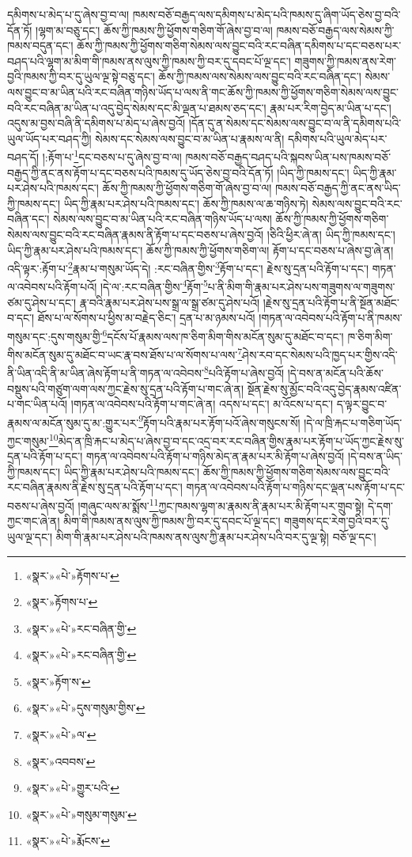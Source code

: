 དམིགས་པ་མེད་པ་དུ་ཞེས་བྱ་བ་ལ། ཁམས་བཅོ་བརྒྱད་ལས་དམིགས་པ་མེད་པའི་ཁམས་དུ་ཞིག་ཡོད་ཅེས་བྱ་བའི་དོན་ཏོ། །ལྷག་མ་བཅུ་དང་། ཆོས་ཀྱི་ཁམས་ཀྱི་ཕྱོགས་གཅིག་གོ་ཞེས་བྱ་བ་ལ། ཁམས་བཅོ་བརྒྱད་ལས་སེམས་ཀྱི་ཁམས་བདུན་དང་། ཆོས་ཀྱི་ཁམས་ཀྱི་ཕྱོགས་གཅིག་སེམས་ལས་བྱུང་བའི་རང་བཞིན་དམིགས་པ་དང་བཅས་པར་བཤད་པའི་ལྷག་མ་མིག་གི་ཁམས་ནས་ལུས་ཀྱི་ཁམས་ཀྱི་བར་དུ་དབང་པོ་ལྔ་དང་། གཟུགས་ཀྱི་ཁམས་ནས་རེག་བྱའི་ཁམས་ཀྱི་བར་དུ་ཡུལ་ལྔ་སྟེ་བཅུ་དང་། ཆོས་ཀྱི་ཁམས་ལས་སེམས་ལས་བྱུང་བའི་རང་བཞིན་དང་། སེམས་ལས་བྱུང་བ་མ་ཡིན་པའི་རང་བཞིན་གཉིས་ཡོད་པ་ལས་ནི་གང་ཆོས་ཀྱི་ཁམས་ཀྱི་ཕྱོགས་གཅིག་སེམས་ལས་བྱུང་བའི་རང་བཞིན་མ་ཡིན་པ་འདུ་བྱེད་སེམས་དང་མི་ལྡན་པ་ཐམས་ཅད་དང་། རྣམ་པར་རིག་བྱེད་མ་ཡིན་པ་དང་། འདུས་མ་བྱས་བཞི་ནི་དམིགས་པ་མེད་པ་ཞེས་བྱའོ། །དོན་དུ་ན་སེམས་དང་སེམས་ལས་བྱུང་བ་ལ་ནི་དམིགས་པའི་ཡུལ་ཡོད་པར་བཤད་ཀྱི། སེམས་དང་སེམས་ལས་བྱུང་བ་མ་ཡིན་པ་རྣམས་ལ་ནི། དམིགས་པའི་ཡུལ་མེད་པར་བཤད་དོ། །:རྟོག་པ་\footnote{«སྣར་»«པེ་»རྟོགས་པ་}དང་བཅས་པ་དུ་ཞེས་བྱ་བ་ལ། ཁམས་བཅོ་བརྒྱད་བཤད་པའི་སྐབས་ཡིན་པས་ཁམས་བཅོ་བརྒྱད་ཀྱི་ནང་ནས་རྟོག་པ་དང་བཅས་པའི་ཁམས་དུ་ཡོད་ཅེས་བྱ་བའི་དོན་ཏོ། །ཡིད་ཀྱི་ཁམས་དང་། ཡིད་ཀྱི་རྣམ་པར་ཤེས་པའི་ཁམས་དང་། ཆོས་ཀྱི་ཁམས་ཀྱི་ཕྱོགས་གཅིག་གོ་ཞེས་བྱ་བ་ལ། ཁམས་བཅོ་བརྒྱད་ཀྱི་ནང་ནས་ཡིད་ཀྱི་ཁམས་དང་། ཡིད་ཀྱི་རྣམ་པར་ཤེས་པའི་ཁམས་དང་། ཆོས་ཀྱི་ཁམས་ལ་ཆ་གཉིས་ཏེ། སེམས་ལས་བྱུང་བའི་རང་བཞིན་དང་། སེམས་ལས་བྱུང་བ་མ་ཡིན་པའི་རང་བཞིན་གཉིས་ཡོད་པ་ལས། ཆོས་ཀྱི་ཁམས་ཀྱི་ཕྱོགས་གཅིག་སེམས་ལས་བྱུང་བའི་རང་བཞིན་རྣམས་ནི་རྟོག་པ་དང་བཅས་པ་ཞེས་བྱའོ། །ཅིའི་ཕྱིར་ཞེ་ན། ཡིད་ཀྱི་ཁམས་དང་། ཡིད་ཀྱི་རྣམ་པར་ཤེས་པའི་ཁམས་དང་། ཆོས་ཀྱི་ཁམས་ཀྱི་ཕྱོགས་གཅིག་ལ། རྟོག་པ་དང་བཅས་པ་ཞེས་བྱ་ཞེ་ན། འདི་ལྟར་:རྟོག་པ་\footnote{«སྣར་»རྟོགས་པ་}རྣམ་པ་གསུམ་ཡོད་དེ། :རང་བཞིན་གྱིས་\footnote{«སྣར་»«པེ་»རང་བཞིན་གྱི་}རྟོག་པ་དང་། རྗེས་སུ་དྲན་པའི་རྟོག་པ་དང་། གཏན་ལ་འབེབས་པའི་རྟོག་པའོ། །དེ་ལ་:རང་བཞིན་གྱིས་\footnote{«སྣར་»«པེ་»རང་བཞིན་གྱི་}རྟོག་\footnote{«སྣར་»རྟོག་ས་}པ་ནི་མིག་གི་རྣམ་པར་ཤེས་པས་གཟུགས་ལ་གཟུགས་ཙམ་དུ་ཤེས་པ་དང་། རྣ་བའི་རྣམ་པར་ཤེས་པས་སྒྲ་ལ་སྒྲ་ཙམ་དུ་ཤེས་པའོ། །རྗེས་སུ་དྲན་པའི་རྟོག་པ་ནི་སྔོན་མཐོང་བ་དང་། ཐོས་པ་ལ་སོགས་པ་ཕྱིས་མ་བརྗེད་ཅིང་། དྲན་པ་མ་ཉམས་པའོ། །གཏན་ལ་འབེབས་པའི་རྟོག་པ་ནི་ཁམས་གསུམ་དང་:དུས་གསུམ་གྱི་\footnote{«སྣར་»«པེ་»དུས་གསུམ་གྱིས་}དངོས་པོ་རྣམས་ལས་ཁ་ཅིག་མིག་གིས་མངོན་སུམ་དུ་མཐོང་བ་དང་། ཁ་ཅིག་མིག་གིས་མངོན་སུམ་དུ་མཐོང་བ་ཡང་རྣ་བས་ཐོས་པ་ལ་སོགས་པ་ལས་\footnote{«སྣར་»«པེ་»ལ་}ཤེས་རབ་དང་སེམས་པའི་ཁྱད་པར་གྱིས་འདི་ནི་ཡིན་འདི་ནི་མ་ཡིན་ཞེས་རྟོག་པ་ནི་གཏན་ལ་འབེབས་\footnote{«སྣར་»འབབས་}པའི་རྟོག་པ་ཞེས་བྱའོ། །དེ་བས་ན་མངོན་པའི་ཆོས་བསྡུས་པའི་གཙུག་ལག་ལས་ཀྱང་རྗེས་སུ་དྲན་པའི་རྟོག་པ་གང་ཞེ་ན། སྔོན་རྗེས་སུ་མྱོང་བའི་འདུ་བྱེད་རྣམས་འཛིན་པ་གང་ཡིན་པའོ། །གཏན་ལ་འབེབས་པའི་རྟོག་པ་གང་ཞེ་ན། འདས་པ་དང་། མ་འོངས་པ་དང་། ད་ལྟར་བྱུང་བ་རྣམས་ལ་མངོན་སུམ་དུ་མ་:གྱུར་པར་\footnote{«སྣར་»«པེ་»གྱུར་པའི་}རྟོག་པའི་རྣམ་པར་རྟོག་པའོ་ཞེས་གསུངས་སོ། །དེ་ལ་ཁྲི་རྐང་པ་གཅིག་ཡོད་ཀྱང་གསུམ་\footnote{«སྣར་»«པེ་»གསུམ་གསུམ་}མེད་ན་ཁྲི་རྐང་པ་མེད་པ་ཞེས་བྱ་བ་དང་འདྲ་བར་རང་བཞིན་གྱིས་རྣམ་པར་རྟོག་པ་ཡོད་ཀྱང་རྗེས་སུ་དྲན་པའི་རྟོག་པ་དང་། གཏན་ལ་འབེབས་པའི་རྟོག་པ་གཉིས་མེད་ན་རྣམ་པར་མི་རྟོག་པ་ཞེས་བྱའོ། །དེ་བས་ན་ཡིད་ཀྱི་ཁམས་དང་། ཡིད་ཀྱི་རྣམ་པར་ཤེས་པའི་ཁམས་དང་། ཆོས་ཀྱི་ཁམས་ཀྱི་ཕྱོགས་གཅིག་སེམས་ལས་བྱུང་བའི་རང་བཞིན་རྣམས་ནི་རྗེས་སུ་དྲན་པའི་རྟོག་པ་དང་། གཏན་ལ་འབེབས་པའི་རྟོག་པ་གཉིས་དང་ལྡན་པས་རྟོག་པ་དང་བཅས་པ་ཞེས་བྱའོ། །གཞུང་ལས་མ་སྨོས་\footnote{«སྣར་»«པེ་»རྨོངས་}ཀྱང་ཁམས་ལྷག་མ་རྣམས་ནི་རྣམ་པར་མི་རྟོག་པར་གྲུབ་སྟེ། དེ་དག་ཀྱང་གང་ཞེ་ན། མིག་གི་ཁམས་ནས་ལུས་ཀྱི་ཁམས་ཀྱི་བར་དུ་དབང་པོ་ལྔ་དང་། གཟུགས་དང་རེག་བྱའི་བར་དུ་ཡུལ་ལྔ་དང་། མིག་གི་རྣམ་པར་ཤེས་པའི་ཁམས་ནས་ལུས་ཀྱི་རྣམ་པར་ཤེས་པའི་བར་དུ་ལྔ་སྟེ། བཅོ་ལྔ་དང་། 
